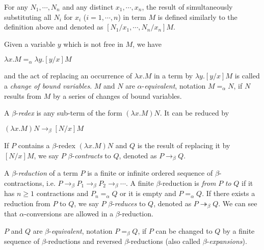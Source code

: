 For any $ N_1, \cdots , N_n $ and any distinct $ x_1, \cdots , x_n $, the result of simultaneously substituting all $ N_i $ for $ x_i $ ($ i = 1, \cdots , n $) in term $ M $ is defined similarly to the definition above and denoted as $ [N_1/x_1, \cdots , N_n/x_n]M $.
\mbox\\
\begin{definition}
\label{definition:alpha}
Given a variable $ y $ which is not free in $ M $, we have
\begin{center}
$ \lambda x.M =_\alpha \lambda y.[y/x]M $
\end{center}
and the act of replacing an occurrence of $ \lambda x.M $ in a term by $ \lambda y.[y/x]M $ is called a \emph{change of bound variables}. $ M $ and $ N $ are $ \alpha $-\emph{equivalent}, notation $ M =_\alpha N $, if $ N $ results from $ M $ by a series of changes of bound variables.
\end{definition}

\begin{definition}
\label{definition:beta}
\mbox\\
\begin{myitemize}
\item A $ \beta $-\emph{redex} is any sub-term of the form $ (\lambda x.M)N $. It can be reduced by
\begin{center}
$ (\lambda x.M)N  \to _\beta [N/x]M $
\end{center}
If $ P $ contains a $ \beta $-redex $ (\lambda x.M)N $ and $ Q $ is the result of replacing it by $ [N/x]M $, we say $ P $ $ \beta $-\emph{contracts} to $ Q $, denoted as $ P \to _\beta Q $.
\item A $ \beta $-\emph{reduction} of a term $ P $ is a finite or infinite ordered sequence of $ \beta $-contractions, i.e. $ P \to _\beta P_1 \to _\beta P_2 \to _\beta \cdots $. A finite $ \beta $-reduction is \emph{from} $ P $ \emph{to} $ Q $ if it has $ n \geq 1 $ contractions and $ P_n = _\alpha Q $ or it is empty and $ P = _\alpha Q $. If there exists a reduction from $ P $ to $ Q $, we say $ P $ $ \beta $-\emph{reduces} to $ Q $, denoted as $ P \twoheadrightarrow _\beta Q $. We can see that $ \alpha $-conversions are allowed in a $ \beta $-reduction.
\item $ P $ and $ Q $ are $ \beta $-\emph{equivalent}, notation $ P =_\beta Q $, if $ P $ can be changed to $ Q $ by a finite sequence of $ \beta $-reductions and reversed $ \beta $-reductions (also called $ \beta $-\emph{expansions}).
\end{myitemize}
\end{definition}

